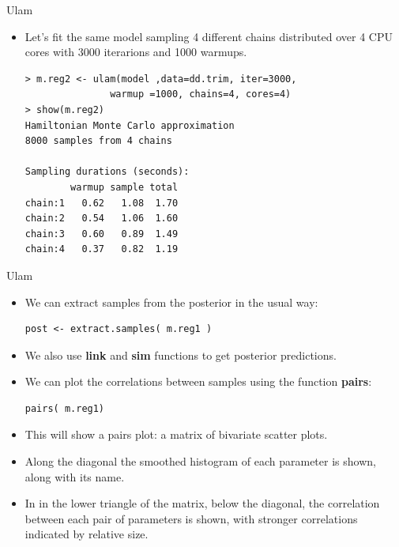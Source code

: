 \documentclass[handout]{beamer}
\begin{document}
\begin{frame}[fragile]{Ulam}
\scriptsize{


\begin{itemize}


\item Let's fit the same model sampling 4 different chains distributed over 4 CPU cores with 3000 iterarions and 1000  warmups.

\begin{verbatim}
> m.reg2 <- ulam(model ,data=dd.trim, iter=3000, 
               warmup =1000, chains=4, cores=4) 
> show(m.reg2)
Hamiltonian Monte Carlo approximation
8000 samples from 4 chains

Sampling durations (seconds):
        warmup sample total
chain:1   0.62   1.08  1.70
chain:2   0.54   1.06  1.60
chain:3   0.60   0.89  1.49
chain:4   0.37   0.82  1.19

\end{verbatim}


 \end{itemize}




} 
\end{frame}


\begin{frame}[fragile]{Ulam}
\scriptsize{


\begin{itemize}


\item We can extract samples from the posterior in the usual way:

\begin{verbatim}
post <- extract.samples( m.reg1 )
\end{verbatim}

\item We also use \textbf{link} and \textbf{sim} functions to get posterior predictions.

\item  We can plot the correlations between samples using the function \textbf{pairs}:

\begin{verbatim}
pairs( m.reg1)
\end{verbatim}

\item This will show a pairs plot: a matrix of bivariate scatter plots. \item Along the diagonal the smoothed histogram of each parameter is shown, along with its name.
\item In in the lower triangle of the matrix, below the diagonal, the correlation between each pair of parameters is shown, with stronger correlations indicated by relative size.

 \end{itemize}




} 
\end{frame}
\end{document}
